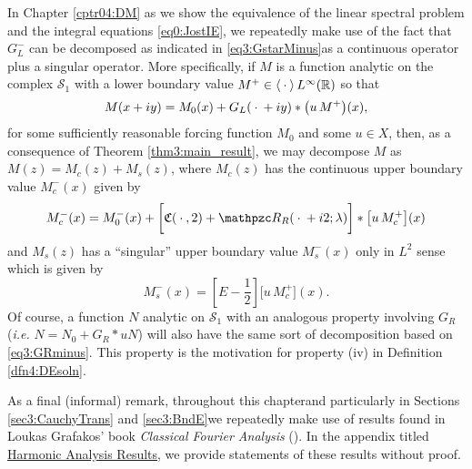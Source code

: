 \documentclass[../dissertation.tex]{subfiles}
\begin{document}
In Chapter \ref{cptr04:DM} as we show the equivalence of the linear spectral 
problem and the integral equations \eqref{eq0:JostIE}, we repeatedly make use 
of the fact that $G_L^-$ can be decomposed as indicated in 
\eqref{eq3:GstarMinus}\textemdash{}as a continuous operator plus a singular operator. 
More specifically, if $M$ is a function analytic on the complex $\mathcal S_1$ 
with a lower boundary value $M^+\in \left\langle \kern 0.5ex \cdot \kern 0.5ex \right\rangle L^\infty(\mathbb R)$ so that
\[
	M(x+iy) = M_0(x) + G_L(\kern 0.5ex \cdot \kern 0.5ex + iy) * \big(u\,M^+\big)(x),
\]
for some sufficiently reasonable forcing function $M_0$ and some 
$u \in X$, then, as a consequence of Theorem \ref{thm3:main_result},
we may decompose $M$ as $M(z) = M_c(z) + M_s(z)$, 
where $M_c(z)$ has the continuous upper boundary value $M_c^-(x)$ given by 
\[
	M_c^-(x) 
		= 
			M_0^-(x)
			+
			\bigg[\mathfrak C(\dotarg, 2) + \mathpzc R_R( \dotarg+i2; \lambda)\bigg]
			* \big[u\,M_c^+\big](x)
\]
and $M_s(z)$ has a ``singular'' upper boundary value $M_s^-(x)$ only in $L^2$ sense
which is given by
\[
	M_s^-(x) 
		=
			\left[E - \frac{1}{2}\right]  \big[u\,M_c^+\big](x).
\]
Of course, a function $N$ analytic on $\mathcal S_1$ with an analogous property
involving $G_R$ ({\em i.e.} $N = N_0 + G_R * uN$) will also have the same 
sort of decomposition based on \eqref{eq3:GRminus}. This property is the 
motivation for property (iv) in Definition \ref{dfn4:DEsoln}.


As a final (informal) remark, throughout this chapter\textemdash{}and particularly in 
Sections \ref{sec3:CauchyTrans} and \ref{sec3:BndE}\textemdash{}we repeatedly
make use of results found in Loukas Grafakos' book \textit{Classical Fourier 
Analysis} (\cite{Grafakos}). In the appendix titled 
\hyperref[app:HA]{Harmonic Analysis Results}, we provide statements
of these results without proof.
\end{document}
